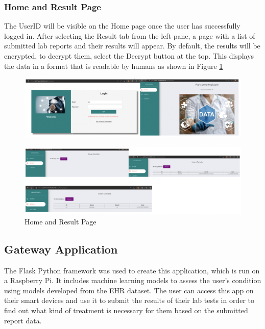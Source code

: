 \documentclass[10pt]{article}
\begin{document}
\subsubsection{Home and Result Page}
The UserID will be visible on the Home page once the user has successfully logged in. After selecting the Result tab from the left pane, a page with a list of submitted lab reports and their results will appear. By default, the results will be encrypted, to decrypt them, select the Decrypt button at the top. This displays the data in a format that is readable by humans as shown in Figure \ref{fig:7}
\begin{figure}[H]
    \begin{center}
        \includegraphics[width=0.9\linewidth,frame]{CA2-template/RIC7.png}
       
    \end{center}
\end{figure}
\begin{figure}[H]
    \begin{center}
        \includegraphics[width=0.9\linewidth,frame]{CA2-template/RIC8.png}
        \caption{Home and Result Page \label{fig:7}}
    \end{center}
\end{figure}

\subsection{Gateway Application}
The Flask Python framework was used to create this application, which is run on a Raspberry Pi. It includes machine learning models to assess the user's condition using models developed from the EHR dataset. The user can access this app on their smart devices and use it to submit the results of their lab tests in order to find out what kind of treatment is necessary for them based on the submitted report data.
\end{document}

